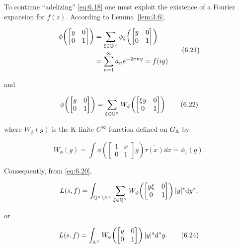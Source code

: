 To continue ``adelizing'' \eqref{eq:6.18} one must exploit the existence of a Fourier expansion for $f(z)$. According to Lemma~\ref{lem:3.6},

\begin{equation}\label{eq:6.21}
\begin{aligned}
\phi\!\left(\begin{bmatrix} y & 0 \\ 0 & 1 \end{bmatrix}\right) &= \sum_{\xi \in \mathbb{Q}^{\times}} \phi_{\xi}\!\left(\begin{bmatrix} y & 0 \\ 0 & 1 \end{bmatrix}\right)\\
&= \sum_{n=1}^{\infty} a_n e^{-2\pi ny} = f(iy)
\end{aligned}\tag{6.21}
\end{equation}

and

\begin{equation}\label{eq:6.22}
\phi\!\left(\begin{bmatrix} y & 0 \\ 0 & 1 \end{bmatrix}\right) = \sum_{\xi \in \mathbb{Q}^{\times}} W_{\phi}\!\left(\begin{bmatrix} \xi y & 0 \\ 0 & 1 \end{bmatrix}\right)\tag{6.22}
\end{equation}

where $W_{\phi}(g)$ is the K-finite $C^{\infty}$ function defined on $G_{\mathbb{A}}$ by

\begin{equation}\label{eq:6.23}
W_{\phi}(g) = \int \phi\!\left(\begin{bmatrix} 1 & x \\ 0 & 1 \end{bmatrix} g\right) \overline{\tau(x)} \dd x = \phi_1(g).\tag{6.23}
\end{equation}

Consequently, from \eqref{eq:6.20},

\[
L(s, f) = \int_{\mathbb{Q}^{\times} \backslash \mathbb{A}^{\times}} \sum_{\xi \in \mathbb{Q}^{\times}} W_{\phi}\!\left(\begin{bmatrix} y\xi & 0 \\ 0 & 1 \end{bmatrix}\right) |y|^s \mathrm{d} y^{*},
\]

or

\begin{equation}\label{eq:6.24}
L(s, f) = \int_{\mathbb{A}^{\times}} W_{\phi}\!\left(\begin{bmatrix} y & 0 \\ 0 & 1 \end{bmatrix}\right) |y|^s \mathrm{d}^{*} y.\tag{6.24}
\end{equation}

